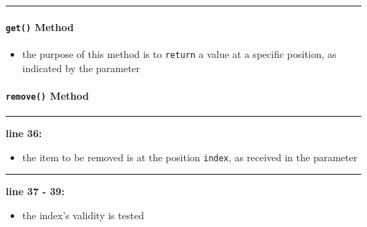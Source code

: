 \vspace{0.1cm}
\noindent
\textcolor{RedOrange}{\rule{\textwidth}{0.5pt}}

\newpage

\paragraph*{\texttt{get()} Method}


\begin{itemize}
    \item[] the purpose of this method is to \texttt{return} a value at a specific position, as indicated by the parameter
\end{itemize}

\paragraph*{\texttt{remove()} Method}


\vspace{0.1cm}
\noindent
\textcolor{RedOrange}{\rule{\textwidth}{0.5pt}}
\vspace{-0.1cm}

\noindent
\begin{minipage}{0.15\textwidth}
    \textcolor{RedOrange}{\textbf{line 36:}}
\end{minipage}
\begin{minipage}{0.85\textwidth}
    \begin{itemize}
        \item[] the item to be removed is at the position \texttt{index}, as received in the parameter
    \end{itemize}
\end{minipage}

\vspace{0.1cm}
\noindent
\textcolor{RedOrange}{\rule{\textwidth}{0.5pt}}
\vspace{-0.1cm}

\noindent
\begin{minipage}{0.15\textwidth}
    \textcolor{RedOrange}{\textbf{line 37 - 39:}}
\end{minipage}
\begin{minipage}{0.85\textwidth}
    \begin{itemize}
        \item[] the index's validity is tested
    \end{itemize}
\end{minipage}

